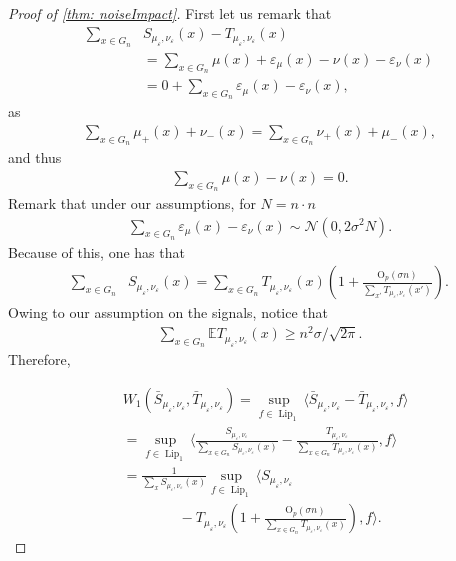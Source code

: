 \documentclass{article}
\theoremstyle{plain}
\theoremstyle{definition}
\theoremstyle{remark}
\providecommand{\Oh}{\mathrm{O}}
\newcommand{\E}{\mathbb{E}}
\begin{document}
\begin{proof}[Proof of \cref{thm: noiseImpact}]
    First let us remark that 
    \begin{align}
        \sum_{x \in G_n} &S_{\mu_\varepsilon,\nu_\varepsilon}(x) - T_{\mu_\varepsilon,\nu_\varepsilon}(x)
        \\
        &=   \sum_{x \in G_n} \mu(x) + \varepsilon_\mu(x) -  \nu(x) - \varepsilon_\nu(x) \nonumber
        \\
        &= 0 + \sum_{x \in G_n}  \varepsilon_\mu(x) - \varepsilon_\nu(x), \nonumber
    \end{align}
    as 
    \begin{align}\sum_{x \in G_n} \mu_+(x) + \nu_-(x) = \sum_{x \in G_n}\nu_+(x) + \mu_-(x),  
    \end{align} and thus 
    \begin{align}\sum_{x \in G_n} \mu(x)  -  \nu(x) =0.
    \end{align}
   Remark that under our assumptions, for $N=n\cdot n$
   \begin{align}
    \sum_{x \in G_n}  \varepsilon_\mu(x) - \varepsilon_\nu(x) \sim \mathcal{N}( 0, 2 \sigma^2 N).
   \end{align}
    Because of this, 
    one has that 
    \begin{align}
    \sum_{x \in G_n} &S_{\mu_\varepsilon,\nu_\varepsilon}(x) =   
    \sum_{x \in G_n} T_{\mu_\varepsilon,\nu_\varepsilon}(x) \left( 1 + \tfrac{\Oh_p\left( \sigma n  \right)}{\sum_{x'} T_{\mu_\varepsilon,\nu_\varepsilon}(x') }\right).
    \end{align} 
    Owing to our assumption on the signals, notice that 
    \begin{align}
    \sum_{x \in G_n} \E T_{\mu_\varepsilon,\nu_\varepsilon}(x) \geq n^2 \sigma/ \sqrt{2\pi}.
    \end{align}
 Therefore,    

\begin{align} 
\label{eq: W1Dual2}
    & W_1 ( \bar S_{\mu_\varepsilon, \nu_\varepsilon}, \bar T_{\mu_\varepsilon, \nu_\varepsilon})
    =
    \sup_{f \in \operatorname{Lip}_1} \langle \bar S_{\mu_\varepsilon, \nu_\varepsilon}- \bar T_{\mu_\varepsilon, \nu_\varepsilon}, f \rangle  \\
    &= \sup_{f \in \operatorname{Lip}_1} \Big\langle \tfrac{ S_{\mu_\varepsilon, \nu_\varepsilon}}{\sum_{x\in G_n} S_{\mu_\varepsilon, \nu_\varepsilon}(x) } - \tfrac{ T_{\mu_\varepsilon, \nu_\varepsilon}}{\sum_{x\in G_n} T_{\mu_\varepsilon, \nu_\varepsilon}(x) }, f \Big\rangle \nonumber \\
    & =\tfrac1{ \sum_{x} S_{\mu_\varepsilon, \nu_\varepsilon}(x )} \sup_{f \in \operatorname{Lip}_1} \Big\langle  S_{\mu_\varepsilon, \nu_\varepsilon} \nonumber \\
    &\qquad \qquad -  T_{\mu_\varepsilon, \nu_\varepsilon} \left(1 + \tfrac{\Oh_p\left( \sigma n  \right)}{\sum_{x \in G_n} T_{\mu_\varepsilon,\nu_\varepsilon}(x)}\right) , f \Big\rangle. \nonumber
\end{align}
\end{proof} 
\end{document}
